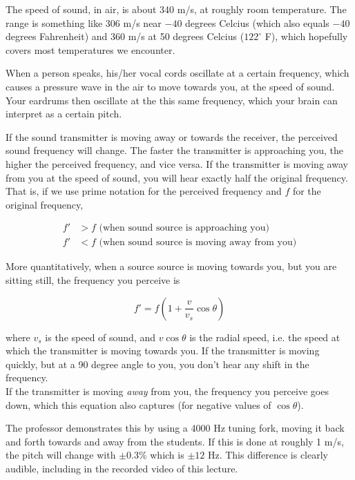 \documentclass[8.01x]{subfiles}
\begin{document}
The speed of sound, in air, is about 340 m/s, at roughly room temperature. The range is something like 306 m/s near $-40$ degrees Celcius (which also equals $-40$ degrees Fahrenheit) and 360 m/s at 50 degrees Celcius ($122^\circ$ F), which hopefully covers most temperatures we encounter.

When a person speaks, his/her vocal cords oscillate at a certain frequency, which causes a pressure wave in the air to move towards you, at the speed of sound. Your eardrums then oscillate at the this same frequency, which your brain can interpret as a certain pitch.

If the sound transmitter is moving away or towards the receiver, the perceived sound frequency will change. The faster the transmitter is approaching you, the higher the perceived frequency, and vice versa. If the transmitter is moving away from you at the speed of sound, you will hear exactly half the original frequency.\\
That is, if we use prime notation for the perceived frequency and $f$ for the original frequency,

\begin{align}
f' &> f \text{ (when sound source is approaching you)}\\
f' &< f \text{ (when sound source is moving away from you)}
\end{align}

More quantitatively, when a source source is moving towards you, but you are sitting still, the frequency you perceive is

\begin{equation}
f' = f(1 + \frac{v}{v_s} \cos \theta)
\end{equation}

where $v_s$ is the speed of sound, and $v \cos \theta$ is the radial speed, i.e. the speed at which the transmitter is moving towards you. If the transmitter is moving quickly, but at a 90 degree angle to you, you don't hear any shift in the frequency.\\
If the transmitter is moving \emph{away} from you, the frequency you perceive goes down, which this equation also captures (for negative values of $\cos \theta$).

The professor demonstrates this by using a 4000 Hz tuning fork, moving it back and forth towards and away from the students. If this is done at roughly 1 m/s, the pitch will change with $\pm 0.3$\% which is $\pm 12$ Hz. This difference is clearly audible, including in the recorded video of this lecture.
\end{document}
